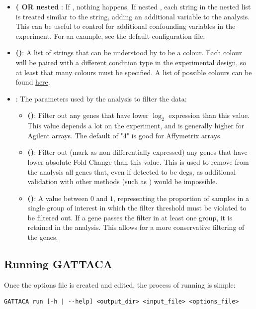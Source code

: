\begin{itemize}
\begin{itemize}
        \item \textbf{ ( OR nested }: If , nothing happens. If nested , each string in the nested list is treated similar to the  string, adding an additional variable to the  analysis. This can be useful to control for additional confounding variables in the experiment. For an example, see the default configuration file.
        \item \textbf{ ()}: A list of strings that can be understood by  to be a colour. Each colour will be paired with a different condition type in the experimental design, so at least that many colours must be specified. A list of possible colours can be found \href{http://www.stat.columbia.edu/~tzheng/files/Rcolor.pdf}{here}.
        \item \textbf{}: The parameters used by the analysis to filter the data:
        \begin{itemize}
            \item \textbf{ ()}: Filter out any genes that have lower $\log_2$ expression than this value. This value depends a lot on the experiment, and is generally higher for Agilent arrays. The default of "4" is good for Affymetrix arrays.
            \item \textbf{ ()}: Filter out (mark as non-differentially-expressed) any genes that have lower absolute Fold Change than this value. This is used to remove from the analysis all genes that, even if detected to be \glspl{deg}, as additional validation with other methods (such as ) would be impossible.
            \item \textbf{ ()}: A value between $0$ and $1$, representing the proportion of samples in a single group of interest in which the  filter threshold must be violated to be filtered out. If a gene passes the filter in at least one group, it is retained in the analysis. This allows for a more conservative filtering of the genes.
        \end{itemize}
    \end{itemize}
\end{itemize}

\subsection{Running GATTACA}
Once the options file is created and edited, the process of running  is simple:
\begin{lstlisting}[style=ShellStyle]
GATTACA run [-h | --help] <output_dir> <input_file> <options_file>
\end{lstlisting}

